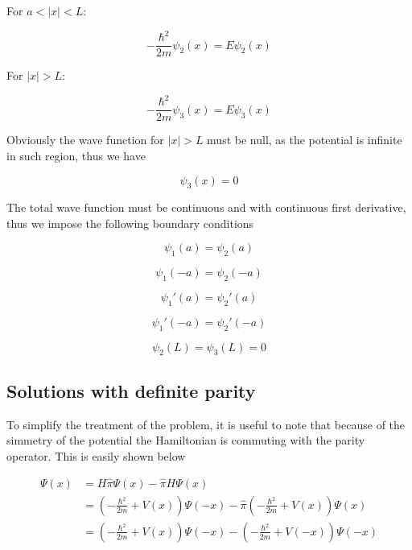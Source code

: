 \documentclass{article}
\begin{document}
For \(a < \left|x\right| < L\):

\begin{equation}
\label{eq:schr2}
-\frac{\hbar^2}{2m}\psi_{2}(x) = E\psi_{2}(x)
\end{equation}

For \(\left|x\right| > L\):

\begin{equation}
\label{eq:schr3}
-\frac{\hbar^2}{2m}\psi_{3}(x) = E\psi_{3}(x)
\end{equation}

Obviously the wave function for \(\left|x\right| > L\) must be null, as the potential is infinite in such region, thus we have

\begin{equation}
\psi_{3}(x) = 0
\end{equation}

The total wave function must be continuous and with continuous first derivative, thus we impose the following boundary conditions

\begin{equation}
\label{eq:continuity}
\psi_{1}(a) =  \psi_{2}(a)
\end{equation}

\begin{equation}
\psi_{1}(-a) =  \psi_{2}(-a)
\end{equation}

\begin{equation}
\label{eq:continuity_derivative}
\psi_{1}'(a) =  \psi_{2}'(a)
\end{equation}

\begin{equation}
\psi_{1}'(-a) =  \psi_{2}'(-a)
\end{equation}

\begin{equation}
\label{eq:null_bound}
\psi_{2}(L) =  \psi_{3}(L) = 0
\end{equation}

\subsection{Solutions with definite parity}
To simplify the treatment of the problem, it is useful to note that because of the simmetry of the potential the Hamiltonian is commuting with the parity operator. This is easily shown below

\begin{align*}
[H, \hat{\pi}] \Psi(x) & = H \hat{\pi} \Psi(x) - \hat{\pi} H \Psi(x) \\ 
  & = \left(-\frac{\hbar^2}{2m} + V(x)\right)\Psi(-x) -  \hat{\pi} \left(-\frac{\hbar^2}{2m} + V(x)\right)\Psi(x) \\ & = \left(-\frac{\hbar^2}{2m} + V(x)\right)\Psi(-x) -  \left(-\frac{\hbar^2}{2m} + V(-x)\right)\Psi(-x)
\end{align*}
\end{document}
